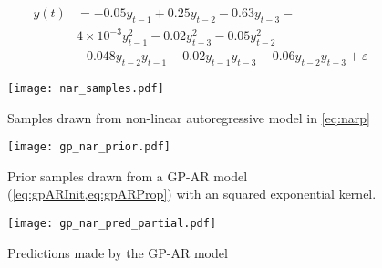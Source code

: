 \begin{equation}\label{eq:narp}
    \begin{aligned}
        y(t) &= -0.05 y_{t-1} + 0.25 y_{t-2} - 0.63 y_{t-3} - \\
        & 4\times10^{-3} y^2_{t-1} - 0.02 y^{2}_{t-3} - 0.05 y^{2}_{t-2} \\ 
        & - 0.048 y_{t-2} y_{t-1} - 0.02 y_{t-1} y_{t-3} - 0.06 y_{t-2} y_{t-3} + \varepsilon
    \end{aligned}
\end{equation}


\begin{figure}
    \centering
    \noindent\texttt{[image: nar\_samples.pdf]}
    \caption{Samples drawn from non-linear autoregressive model in \cref{eq:narp}}
    \label{fig:narpSamples}
\end{figure}




\begin{figure}
    \centering
    \noindent\texttt{[image: gp\_nar\_prior.pdf]}
    \caption{Prior samples drawn from a GP-AR model (\cref{eq:gpARInit,eq:gpARProp}) with an squared exponential kernel.}
    \label{fig:gparPrior}
\end{figure}

\begin{figure}
    \centering
    \noindent\texttt{[image: gp\_nar\_pred\_partial.pdf]}
    \caption{Predictions made by the GP-AR model}
    \label{fig:gparPost}
\end{figure}

